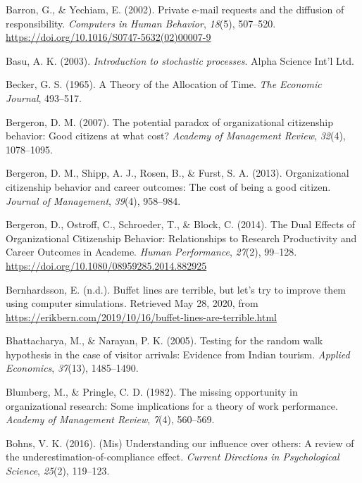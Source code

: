 \documentclass[english,,man]{apa6}
\begin{document}
\leavevmode\hypertarget{ref-barron_private_2002}{}%
Barron, G., \& Yechiam, E. (2002). Private e-mail requests and the diffusion of responsibility. \emph{Computers in Human Behavior}, \emph{18}(5), 507--520. \url{https://doi.org/10.1016/S0747-5632(02)00007-9}

\leavevmode\hypertarget{ref-basu_introduction_2003}{}%
Basu, A. K. (2003). \emph{Introduction to stochastic processes}. Alpha Science Int'l Ltd.

\leavevmode\hypertarget{ref-becker_theory_1965}{}%
Becker, G. S. (1965). A Theory of the Allocation of Time. \emph{The Economic Journal}, 493--517.

\leavevmode\hypertarget{ref-bergeron_potential_2007}{}%
Bergeron, D. M. (2007). The potential paradox of organizational citizenship behavior: Good citizens at what cost? \emph{Academy of Management Review}, \emph{32}(4), 1078--1095.

\leavevmode\hypertarget{ref-bergeron_organizational_2013}{}%
Bergeron, D. M., Shipp, A. J., Rosen, B., \& Furst, S. A. (2013). Organizational citizenship behavior and career outcomes: The cost of being a good citizen. \emph{Journal of Management}, \emph{39}(4), 958--984.

\leavevmode\hypertarget{ref-bergeron_dual_2014}{}%
Bergeron, D., Ostroff, C., Schroeder, T., \& Block, C. (2014). The Dual Effects of Organizational Citizenship Behavior: Relationships to Research Productivity and Career Outcomes in Academe. \emph{Human Performance}, \emph{27}(2), 99--128. \url{https://doi.org/10.1080/08959285.2014.882925}

\leavevmode\hypertarget{ref-bernhardsson_buffet_nodate}{}%
Bernhardsson, E. (n.d.). Buffet lines are terrible, but let's try to improve them using computer simulations. Retrieved May 28, 2020, from \url{https://erikbern.com/2019/10/16/buffet-lines-are-terrible.html}

\leavevmode\hypertarget{ref-bhattacharya_testing_2005}{}%
Bhattacharya, M., \& Narayan, P. K. (2005). Testing for the random walk hypothesis in the case of visitor arrivals: Evidence from Indian tourism. \emph{Applied Economics}, \emph{37}(13), 1485--1490.

\leavevmode\hypertarget{ref-blumberg_missing_1982}{}%
Blumberg, M., \& Pringle, C. D. (1982). The missing opportunity in organizational research: Some implications for a theory of work performance. \emph{Academy of Management Review}, \emph{7}(4), 560--569.

\leavevmode\hypertarget{ref-bohns_mis_2016}{}%
Bohns, V. K. (2016). (Mis) Understanding our influence over others: A review of the underestimation-of-compliance effect. \emph{Current Directions in Psychological Science}, \emph{25}(2), 119--123.
\end{document}
